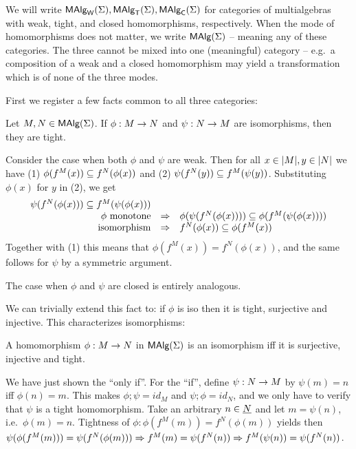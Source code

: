 \documentclass[10pt]{article}
\begin{document}
We will write $\mbox{\rm\sf MAlg}_{\sf W}(\Sigma), \mbox{\rm\sf MAlg}_{\sf T}(\Sigma),
\mbox{\rm\sf MAlg}_{\sf C}(\Sigma)$ for categories of multialgebras with weak, tight, and closed
homomorphisms, respectively. 
When the mode of homomorphisms does not matter, we write $\mbox{\rm\sf MAlg}(\Sigma)$ -- meaning
any of these categories.
The three cannot be mixed into one
(meaningful) category -- e.g.\ a composition of a weak and a closed
homomorphism may yield a transformation which is of none of the three
modes. \vspace*{1ex}

\noindent
First we register a few facts common to all three categories:
%
\begin{Prop}
\label{le:isotight}
Let $M, N\in\mbox{\rm\sf MAlg}(\Sigma)$. If $\phi:M\rightarrow N$ and $\psi:N\rightarrow M$ are
isomorphisms, then they are tight.
\end{Prop}

\begin{Proof}
Consider the case when both $\phi$ and $\psi$ are weak. Then
for all $x\in |M|, y\in |N|$ we have (1) $\phi(f^M(x))\subseteq
f^N(\phi(x))$ and (2) $\psi(f^N(y))\subseteq f^M(\psi(y))$.  Substituting
$\phi(x)$ for $y$ in (2), we get
\[
\begin{array}{rcl}
 {\psi(f^N(\phi(x))) \subseteq f^M(\psi(\phi(x)))} \\
\phi\ {\rm monotone} & \Rightarrow & \phi(\psi(f^N(\phi(x)))) \subseteq \phi(f^M(\psi(\phi(x)))) \\
{\rm isomorphism} & 
\Rightarrow & f^N(\phi(x)) \subseteq \phi(f^M(x))
\end{array} 
\]
Together with (1) this means that $\phi(f^M(x)) = f^N(\phi(x))$, and
the same follows for $\psi$ by a symmetric argument.

The case when $\phi$ and $\psi$ are closed is entirely analogous.
\end{Proof}

\noindent
We can trivially extend this fact to: if $\phi$ is iso then it is
tight, surjective and injective. This characterizes isomorphisms:

\begin{Prop}
A homomorphism $\phi:M\rightarrow N$ in $\mbox{\rm\sf MAlg}(\Sigma)$ is an isomorphism iff it is 
surjective, injective and tight.
\end{Prop}

\begin{Proof}
We have just shown the ``only if''. For the ``if'', define
$\psi:N\rightarrow M$ by $\psi(m)=n$ iff $\phi(n)=m$. This makes
$\phi;\psi=id_M$ and $\psi;\phi=id_N$, and we only have to verify that
$\psi$ is a tight homomorphism. Take an arbitrary $n\in\underline {N}$ and
let $m=\psi(n)$, i.e.\ $\phi(m)=n$. Tightness of $\phi: \phi(f^M(m))=
f^N(\phi(m))$ yields then $\psi(\phi(f^M(m)))= \psi(f^N(\phi(m)))
\Rightarrow f^M(m)=\psi(f^N(n)) \Rightarrow f^M(\psi(n))=\psi(f^N(n))$.
\end{Proof}
\end{document}
